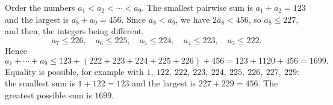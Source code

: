 Order the numbers $a_1<a_2<\cdots<a_9$. The smallest pairwise sum is $a_1+a_2=123$ and the largest is $a_8+a_9=456$. Since $a_8<a_9$, we have $2a_8<456$, so $a_8\le227$, and then, the integers being different,
\[
a_7\le226,\quad a_6\le225,\quad a_5\le224,\quad a_4\le223,\quad a_3\le222 .
\]
Hence
\[
a_1+\cdots+a_9\le123+(222+223+224+225+226)+456=123+1120+456=1699 .
\]
Equality is possible, for example with $1,\ 122,\ 222,\ 223,\ 224,\ 225,\ 226,\ 227,\ 229$: the smallest sum is $1+122=123$ and the largest is $227+229=456$. The greatest possible sum is $\boxed{1699}$.
